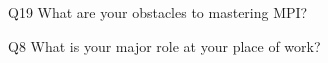 \begin{description}%
\item{Q19} What are your obstacles to mastering MPI?%
\item{Q8} What is your major role at your place of work?%
\end{description}%
